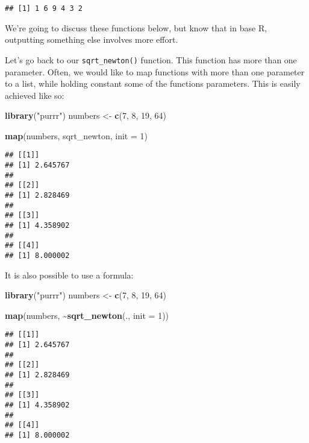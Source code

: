 \documentclass[
]{article}
\newenvironment{Shaded}{\begin{snugshade}}{\end{snugshade}}
\newcommand{\DataTypeTok}[1]{\textcolor[rgb]{0.13,0.29,0.53}{#1}}
\newcommand{\DecValTok}[1]{\textcolor[rgb]{0.00,0.00,0.81}{#1}}
\newcommand{\KeywordTok}[1]{\textcolor[rgb]{0.13,0.29,0.53}{\textbf{#1}}}
\newcommand{\NormalTok}[1]{#1}
\newcommand{\OperatorTok}[1]{\textcolor[rgb]{0.81,0.36,0.00}{\textbf{#1}}}
\newcommand{\StringTok}[1]{\textcolor[rgb]{0.31,0.60,0.02}{#1}}
\begin{document}
\begin{verbatim}
## [1] 1 6 9 4 3 2
\end{verbatim}

We're going to discuss these functions below, but know that in base R, outputting something else
involves more effort.

Let's go back to our \texttt{sqrt\_newton()} function. This function has more than one parameter. Often,
we would like to map functions with more than one parameter to a list, while holding constant
some of the functions parameters. This is easily achieved like so:

\begin{Shaded}
\begin{Highlighting}[]
\KeywordTok{library}\NormalTok{(}\StringTok{"purrr"}\NormalTok{)}
\NormalTok{numbers \textless{}{-}}\StringTok{ }\KeywordTok{c}\NormalTok{(}\DecValTok{7}\NormalTok{, }\DecValTok{8}\NormalTok{, }\DecValTok{19}\NormalTok{, }\DecValTok{64}\NormalTok{)}

\KeywordTok{map}\NormalTok{(numbers, sqrt\_newton, }\DataTypeTok{init =} \DecValTok{1}\NormalTok{)}
\end{Highlighting}
\end{Shaded}

\begin{verbatim}
## [[1]]
## [1] 2.645767
## 
## [[2]]
## [1] 2.828469
## 
## [[3]]
## [1] 4.358902
## 
## [[4]]
## [1] 8.000002
\end{verbatim}

It is also possible to use a formula:

\begin{Shaded}
\begin{Highlighting}[]
\KeywordTok{library}\NormalTok{(}\StringTok{"purrr"}\NormalTok{)}
\NormalTok{numbers \textless{}{-}}\StringTok{ }\KeywordTok{c}\NormalTok{(}\DecValTok{7}\NormalTok{, }\DecValTok{8}\NormalTok{, }\DecValTok{19}\NormalTok{, }\DecValTok{64}\NormalTok{)}

\KeywordTok{map}\NormalTok{(numbers, }\OperatorTok{\textasciitilde{}}\KeywordTok{sqrt\_newton}\NormalTok{(., }\DataTypeTok{init =} \DecValTok{1}\NormalTok{))}
\end{Highlighting}
\end{Shaded}

\begin{verbatim}
## [[1]]
## [1] 2.645767
## 
## [[2]]
## [1] 2.828469
## 
## [[3]]
## [1] 4.358902
## 
## [[4]]
## [1] 8.000002
\end{verbatim}
\end{document}
